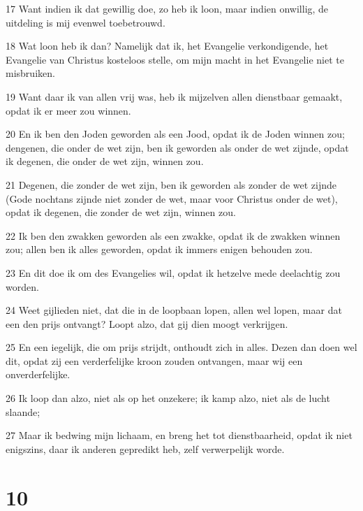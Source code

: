 \par 17 Want indien ik dat gewillig doe, zo heb ik loon, maar indien onwillig, de uitdeling is mij evenwel toebetrouwd.
\par 18 Wat loon heb ik dan? Namelijk dat ik, het Evangelie verkondigende, het Evangelie van Christus kosteloos stelle, om mijn macht in het Evangelie niet te misbruiken.
\par 19 Want daar ik van allen vrij was, heb ik mijzelven allen dienstbaar gemaakt, opdat ik er meer zou winnen.
\par 20 En ik ben den Joden geworden als een Jood, opdat ik de Joden winnen zou; dengenen, die onder de wet zijn, ben ik geworden als onder de wet zijnde, opdat ik degenen, die onder de wet zijn, winnen zou.
\par 21 Degenen, die zonder de wet zijn, ben ik geworden als zonder de wet zijnde (Gode nochtans zijnde niet zonder de wet, maar voor Christus onder de wet), opdat ik degenen, die zonder de wet zijn, winnen zou.
\par 22 Ik ben den zwakken geworden als een zwakke, opdat ik de zwakken winnen zou; allen ben ik alles geworden, opdat ik immers enigen behouden zou.
\par 23 En dit doe ik om des Evangelies wil, opdat ik hetzelve mede deelachtig zou worden.
\par 24 Weet gijlieden niet, dat die in de loopbaan lopen, allen wel lopen, maar dat een den prijs ontvangt? Loopt alzo, dat gij dien moogt verkrijgen.
\par 25 En een iegelijk, die om prijs strijdt, onthoudt zich in alles. Dezen dan doen wel dit, opdat zij een verderfelijke kroon zouden ontvangen, maar wij een onverderfelijke.
\par 26 Ik loop dan alzo, niet als op het onzekere; ik kamp alzo, niet als de lucht slaande;
\par 27 Maar ik bedwing mijn lichaam, en breng het tot dienstbaarheid, opdat ik niet enigszins, daar ik anderen gepredikt heb, zelf verwerpelijk worde.

\chapter{10}

